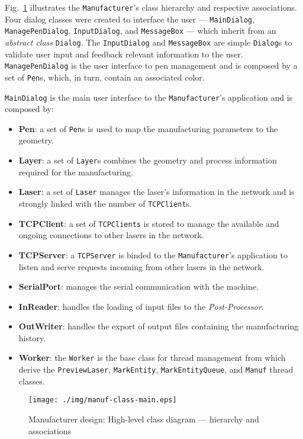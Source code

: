Fig.~\ref{fig:manuf-class-main} illustrates the \texttt{Manufacturer}'s class hierarchy and
respective associations. Four dialog classes were created to interface the user ---
\texttt{MainDialog}, \texttt{ManagePenDialog}, \texttt{InputDialog}, and
\texttt{MessageBox} --- which inherit from an \emph{abstract class}
\texttt{Dialog}. The \texttt{InputDialog} and \texttt{MessageBox} are simple
\texttt{Dialog}s to validate user input and feedback relevant information to the
user.
\texttt{ManagePenDialog} is the user interface to pen management and is composed
by a set of \texttt{Pen}s, which, in turn, contain an associated color. 

\texttt{MainDialog} is the main user interface to the \texttt{Manufacturer}'s
application and is composed by:
\begin{itemize}
\item \textbf{Pen}: a set of \texttt{Pen}s is used to map the manufacturing
  parameters to the geometry.
\item \textbf{Layer}: a set of \texttt{Layer}s combines the geometry and
  process information required for the manufacturing.
\item \textbf{Laser}: a set of \texttt{Laser} manages the laser's information in
  the network and is strongly linked with the number of \texttt{TCPClient}s.
\item \textbf{TCPClient}: a set of \texttt{TCPClients} is stored to manage the
  available and ongoing connections to other lasers in the network.
\item \textbf{TCPServer}: a \texttt{TCPServer} is binded to the
  \texttt{Manufacturer}'s application to listen and serve requests incoming from
  other lasers in the network.
\item \textbf{SerialPort}: manages the serial communication with the machine.
\item \textbf{InReader}: handles the loading of input files to the \emph{Post-Processor}.
\item \textbf{OutWriter}: handles the export of output files containing the
  manufacturing history.
\item \textbf{Worker}: the \texttt{Worker} is the base class for thread
  management from which derive the \texttt{PreviewLaser}, \texttt{MarkEntity},
  \texttt{MarkEntityQueue}, and \texttt{Manuf} thread classes.
\end{itemize}
% 
\begin{figure}[!hbt]
  \centering
  \texttt{[image: ./img/manuf-class-main.eps]}
  \caption{Manufacturer design: High-level class diagram --- hierarchy and associations}%
  \label{fig:manuf-class-main}
\end{figure}

